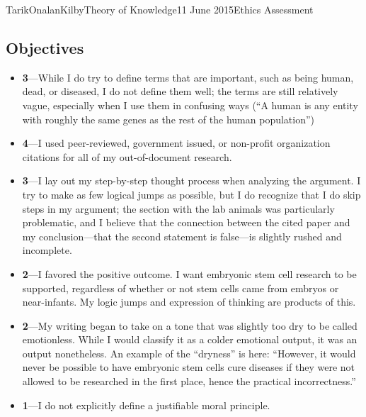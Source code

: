 \documentclass[a4paper,12pt]{article}
\begin{document}
\begin{mla}{Tarik}{Onalan}{Kilby}{Theory of Knowledge}{11 June 2015}{Ethics Assessment}
            \subsection{Objectives}
                \begin{itemize}
                    \item \textbf{3}---While I do try to define terms that are important, such as being human,
                        dead, or diseased, I do not define them well; the terms are still relatively vague,
                        especially when I use them in confusing ways (``A human is any entity with roughly the
                        same genes as the rest of the human population'')
                    \item \textbf{4}---I used peer-reviewed, government issued, or non-profit organization
                        citations for all of my out-of-document research.
                    \item \textbf{3}---I lay out my step-by-step thought process when analyzing the argument.
                        I try to make as few logical jumps as possible, but I do recognize that I do skip steps
                        in my argument; the section with the lab animals was particularly problematic, and I
                        believe that the connection between the cited paper and my conclusion---that the
                        second statement is false---is slightly rushed and incomplete.
                    \item \textbf{2}---I favored the positive outcome. I want embryonic stem cell research to
                        be supported, regardless of whether or not stem cells came from embryos or near-infants.
                        My logic jumps and expression of thinking are products of this.
                    \item \textbf{2}---My writing began to take on a tone that was slightly too dry to be called
                        emotionless. While I would classify it as a colder emotional output, it was an output
                        nonetheless. An example of the ``dryness'' is here: ``However, it would never be possible
                        to have embryonic stem cells cure diseases if they were not allowed to be researched in
                        the first place, hence the practical incorrectness.''
                    \item \textbf{1}---I do not explicitly define a justifiable moral principle.
                \end{itemize}
        \printbibliography
    \end{mla}
\end{document}

